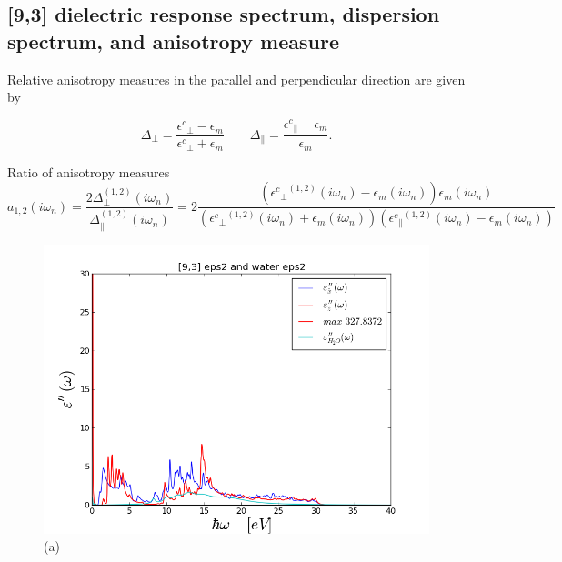 \documentclass[a4paper]{article}
\begin{document}
\begin{center}
\section{[9,3] dielectric response spectrum, dispersion spectrum, and anisotropy measure}
Relative anisotropy measures in the parallel and perpendicular direction are given by

\begin{equation}
\Delta_{\perp}=\frac{{\epsilon^{c}}_{\perp}-\epsilon_{m}}{{\epsilon^{c}}_{\perp}+\epsilon_{m}}\qquad\Delta_{\parallel}=\frac{{\epsilon^{c}}_{\parallel}-\epsilon_{m}}{\epsilon_{m}}.
\label{anisoind}
\end{equation}

Ratio of anisotropy measures
\begin{equation}
a_{1,2}(i \omega_n) = \frac{2 \Delta_{\perp}^{(1,2)}(i \omega_n)}{\Delta_{\parallel}^{(1,2)}(i \omega_n)} = 2 \frac{({{\epsilon^{c}}_{\perp}}^{(1,2)}(i \omega_n) -\epsilon_{m}(i \omega_n)) \epsilon_{m}(i \omega_n)}{({{\epsilon^{c}}_{\perp}}^{(1,2)}(i \omega_n)+\epsilon_{m}(i \omega_n)) ({{\epsilon^{c}}_{\parallel}}^{(1,2)}(i \omega_n) -\epsilon_{m}(i \omega_n))}
\label{eq:adef}
\end{equation}
\begin{figure}[t!]
\begin{center}
\begin{minipage}[b]{0.40\textwidth}
\begin{center}
\includegraphics[width=1.4\textwidth]{prop_plots/93w93_eps2.png} (a)
\end{center}

\end{minipage}
\end{center}
\end{figure}
\end{center}
\end{document}
